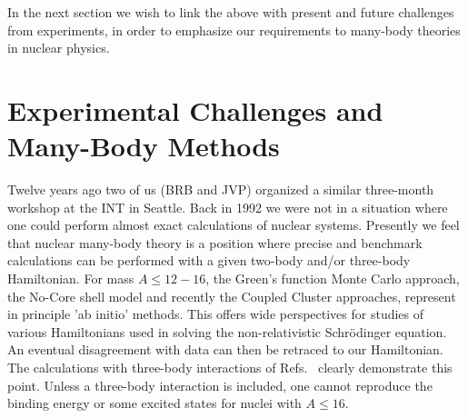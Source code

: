 \documentclass[12pt]{iopart}
\begin{document}
In the next section we wish to link the above with present and future challenges
from experiments, in order to emphasize our requirements to many-body theories
in nuclear physics.

\section{Experimental Challenges and Many-Body Methods} 

Twelve years ago two of us (BRB and JVP) organized a similar three-month workshop
at the INT in Seattle. Back in 1992 we were not in a situation where one could perform
almost exact calculations of nuclear systems.
Presently we feel that nuclear many-body theory is a  position
where precise and benchmark calculations can be performed with a given
two-body and/or three-body Hamiltonian. 
For mass $A\le 12-16$, the Green's function Monte Carlo
approach, the No-Core shell model and recently the Coupled Cluster approaches,
represent in principle 'ab initio' methods. This offers wide perspectives for studies
of various Hamiltonians used in  solving the non-relativistic Schr\"odinger
equation. An eventual disagreement with data can then be retraced to our Hamiltonian.
The calculations with three-body interactions of Refs.~\cite{bobsteve1,erichpetr}
clearly demonstrate this point. Unless a three-body interaction is included, one 
cannot  reproduce the binding energy or some excited states for nuclei with 
$A\le 16$. 
\end{document}
